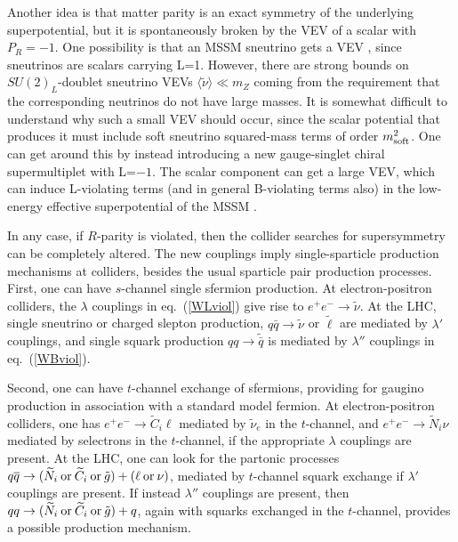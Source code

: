 \documentclass[12pt]{article}
\def\stilde{\widetilde}
\begin{document}
Another idea is that matter parity is an exact symmetry of the underlying 
superpotential, but it is spontaneously broken by the VEV of a scalar with 
$P_R=-1$.  One possibility is that an MSSM sneutrino gets a VEV 
\cite{sneutvevRPV}, since sneutrinos are scalars carrying L=1. However, 
there are strong bounds \cite{nonsneutvevRPV} on $SU(2)_L$-doublet 
sneutrino VEVs $\langle \stilde \nu \rangle \ll m_Z$ coming from the 
requirement that the corresponding neutrinos do not have large masses. It 
is somewhat difficult to understand why such a small VEV should occur, 
since the scalar potential that produces it must include soft sneutrino 
squared-mass terms of order $m^2_{\rm soft}$. One can get around this by 
instead introducing a new gauge-singlet chiral supermultiplet with L=$-1$. 
The scalar component can get a large VEV, which can induce L-violating 
terms (and in general B-violating terms also) in the low-energy effective 
superpotential of the MSSM \cite{nonsneutvevRPV}.

In any case, if $R$-parity is violated, then the collider searches for
supersymmetry can be completely altered. The new couplings imply
single-sparticle production mechanisms at colliders, besides the usual
sparticle pair production processes. First, one can have $s$-channel
single sfermion production. At electron-positron colliders, the $\lambda$
couplings in eq.~(\ref{WLviol}) give rise to $e^+e^-\rightarrow \stilde
\nu$. At the LHC, single sneutrino or charged slepton
production, $q \bar q \rightarrow \stilde \nu$ or $\stilde \ell$ are
mediated by $\lambda'$ couplings, and single squark production $qq
\rightarrow \stilde {\bar q}$ is mediated by $\lambda''$ couplings in
eq.~(\ref{WBviol}). 

Second, one can have $t$-channel exchange of sfermions, providing for
gaugino production in association with a standard model fermion. At
electron-positron colliders, one has $e^+ e^- \rightarrow \stilde C_i
\ell$ mediated by $\stilde \nu_e$ in the $t$-channel, and $e^+ e^-
\rightarrow \stilde N_i \nu$ mediated by selectrons in the $t$-channel, if
the appropriate $\lambda$ couplings are present. At the 
LHC, one can look for the partonic processes $q\overline q \rightarrow
(\stilde N_i\>{\rm or}\>\stilde C_i\>{\rm or}\>\tilde g)+(\ell\>{\rm
or}\>\nu)$, mediated by $t$-channel squark exchange if $\lambda'$
couplings are present. If instead $\lambda''$ couplings are present, then
$qq \rightarrow (\stilde N_i\>{\rm or}\>\stilde C_i\>{\rm or}\>\tilde g)+
q$, again with squarks exchanged in the $t$-channel, provides a possible
production mechanism. 
\end{document}

